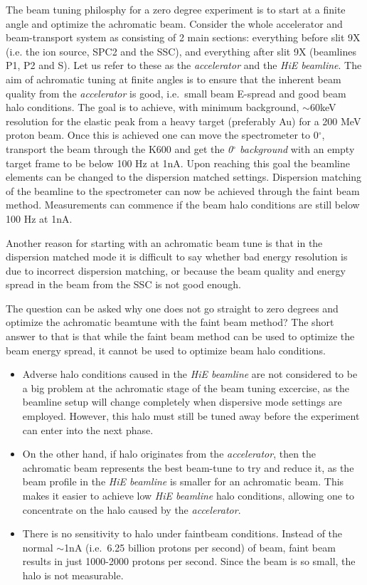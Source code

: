 \documentclass[11pt]{report}
\begin{document}
The beam tuning philosphy for a zero degree experiment
is to start at a finite angle and optimize the achromatic beam. 
Consider the whole accelerator and beam-transport 
system as consisting of 2 main sections: everything before slit 9X 
(i.e. the ion source, SPC2 and the SSC), 
and everything after slit 9X (beamlines P1, P2 and S). Let us refer to these as 
the {\it accelerator} and the {\it HiE beamline}.
The aim of achromatic tuning at finite angles is to ensure that 
the inherent beam quality from the {\it accelerator} is good, i.e.~small 
beam E-spread and good beam halo conditions.
The goal is to achieve, with minimum background, 
$\sim$60keV resolution for the elastic peak from a heavy target (preferably Au) for a 200 MeV proton beam.
Once this is achieved one can move the spectrometer to 0$^{\circ}$, transport the beam through the K600
and get the {\it 0$^{\circ}$ background} with an empty target frame to be below 100 Hz at 1nA.
Upon reaching this goal the beamline elements can be changed to the dispersion 
matched settings. Dispersion matching of the beamline to the spectrometer
can now be achieved through the faint beam method. Measurements can commence 
if the beam halo conditions are still below 100 Hz at 1nA. 

Another reason for starting with an achromatic beam tune is that 
in the dispersion matched mode it is difficult to say whether bad energy resolution
is due to incorrect dispersion matching, or because the beam quality and energy spread in the beam
from the SSC is not good enough.


The question can be asked why one does not go straight to zero
degrees and optimize the achromatic beamtune with the faint beam method?  
The short answer to that is that while
the faint beam method can be used to optimize the beam energy spread, 
it cannot be used to optimize beam halo conditions. 

\begin{itemize}
\item Adverse halo conditions caused in the {\it HiE beamline} are not considered 
to be a big problem at the achromatic stage of the beam tuning excercise, 
as the beamline setup will change completely when dispersive mode settings are employed. 
However, this halo must still be tuned away before the experiment can enter into the next phase.

\item On the other hand, if halo originates from the {\it accelerator}, then the achromatic beam
represents the best beam-tune to try and reduce it, as the beam profile 
in the {\it HiE beamline} is smaller for an achromatic beam.
This makes it easier to achieve low {\it HiE beamline} halo conditions, allowing one to
concentrate on the halo caused by the {\it accelerator}.

\item There is no sensitivity to halo under faintbeam conditions.
Instead of the normal $\sim$1nA (i.e.~6.25 billion protons per second) of beam, 
faint beam results in just 1000-2000 protons per second. Since the beam is so small, the
halo is not measurable.

\end{itemize}
\end{document}
